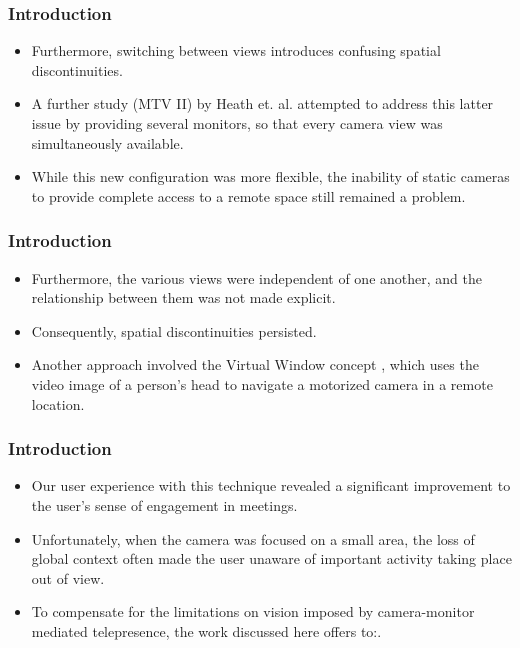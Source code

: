 \documentclass{beamer}
\begin{document}
\begin{frame}
\frametitle{Introduction}

\begin{itemize}
\item Furthermore, switching between views introduces confusing spatial discontinuities.
\item A further study (MTV II) by Heath et. al.  attempted to address this latter issue by providing several monitors, so that every camera view was simultaneously available.
\item While this new configuration was more flexible, the inability of static cameras to provide complete access to a remote space still remained a problem.
\end{itemize}

\end{frame}

\begin{frame}
\frametitle{Introduction}

\begin{itemize}
\item Furthermore, the various views were independent of one another, and the relationship between them was not made explicit.
\item Consequently, spatial discontinuities persisted.
\item Another approach involved the Virtual Window concept , which uses the video image of a person's head to navigate a motorized camera in a remote location.
\end{itemize}

\end{frame}

\begin{frame}
\frametitle{Introduction}

\begin{itemize}
\item Our user experience with this technique  revealed a significant improvement to the user's sense of engagement in meetings.
\item Unfortunately, when the camera was focused on a small area, the loss of global context often made the user unaware of important activity taking place out of view.
\item To compensate for the limitations on vision imposed by camera-monitor mediated telepresence, the work discussed here offers to:.
\end{itemize}

\end{frame}
\end{document}
